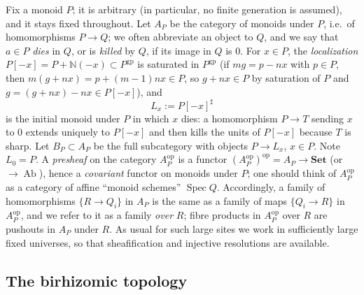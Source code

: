 \documentclass[11pt]{article}
\newcommand{\N}{\mathbb N}
\newcommand{\gp}{\mathrm{gp}}
\newcommand{\Ab}{\operatorname{Ab}}
\theoremstyle{definition}
\theoremstyle{remark}
\begin{document}
Fix a monoid \(P\); it is arbitrary (in particular, no finite generation
is assumed), and it stays fixed throughout.  Let \(A_P\) be the category of
monoids under \(P\),
i.e.\ of homomorphisms \(P\to Q\); we often abbreviate an object to \(Q\),
and we say that \(a\in P\) \emph{dies} in \(Q\), or is \emph{killed} by
\(Q\), if its image in \(Q\) is \(0\).
For \(x\in P\), the \emph{localization} \(P[-x]=P+\N(-x)\subset P^{\gp}\) is
saturated in \(P^{\gp}\) (if \(mg=p-nx\) with \(p\in P\), then
\(m(g+nx)=p+(m-1)nx\in P\), so \(g+nx\in P\) by saturation of \(P\) and
\(g=(g+nx)-nx\in P[-x]\)), and
\[
   L_x:=P[-x]^\sharp
\]
is the initial monoid under \(P\) in which \(x\) dies: a homomorphism
\(P\to T\) sending \(x\) to \(0\) extends uniquely to \(P[-x]\) and then
kills the units of \(P[-x]\) because \(T\) is sharp.  Let \(B_P\subset A_P\)
be the full subcategory with objects \(P\to L_x\), \(x\in P\).  Note
\(L_0=P\).
A \emph{presheaf} on the category \(A_P^{\mathrm{op}}\) is a functor
\((A_P^{\mathrm{op}})^{\mathrm{op}}=A_P\to\mathbf{Set}\) (or \(\to\Ab\)),
hence a \emph{covariant} functor on monoids under \(P\); one should think of
\(A_P^{\mathrm{op}}\) as a category of affine ``monoid schemes''
\(\operatorname{Spec}Q\).  Accordingly, a family of homomorphisms
\(\{R\to Q_i\}\) in \(A_P\) is the same as a family of maps
\(\{Q_i\to R\}\) in \(A_P^{\mathrm{op}}\), and we refer to it as a family
\emph{over} \(R\); fibre products in \(A_P^{\mathrm{op}}\) over \(R\) are
pushouts in \(A_P\) under \(R\).  As usual for such large sites we work in
sufficiently large fixed universes, so that sheafification and injective
resolutions are available.

\subsection{The birhizomic topology}
\end{document}
